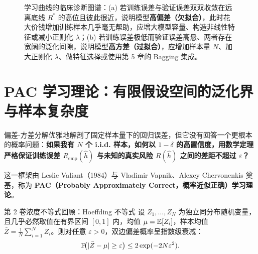 \begin{figure}[htbp]
\caption{学习曲线的临床诊断图谱：(a) 若训练误差与验证误差双双收敛在远离底线 $R^*$ 的高位且彼此很近，说明模型\textbf{高偏差（欠拟合）}，此时花大价钱增加训练样本几乎毫无帮助，应增大模型容量、构造非线性特征或减小正则化 $\lambda$；(b) 若训练误差极低而验证误差高悬、两者存在宽阔的泛化间隙，说明模型\textbf{高方差（过拟合）}，应增加样本量 $N$、加大正则化 $\lambda$、做特征选择或使用第 5 章的 Bagging 集成。}\label{fig:v4-learning-curves}
\end{figure}

\section{PAC 学习理论：有限假设空间的泛化界与样本复杂度}

偏差-方差分解优雅地解剖了固定样本量下的回归误差，但它没有回答一个更根本的概率问题：\textbf{如果我有 $N$ 个 i.i.d. 样本，如何以 $1-\delta$ 的高置信度，用数学定理严格保证训练误差 $R_{\mathrm{emp}}(\hat{h})$ 与未知的真实风险 $R(\hat{h})$ 之间的差距不超过 $\varepsilon$？}

这一框架由 Leslie Valiant（1984）与 Vladimir Vapnik、Alexey Chervonenkis 奠基，称为 \textbf{PAC（Probably Approximately Correct，概率近似正确）学习理论}。

\begin{recallBox}{第 2 卷浓度不等式回顾：Hoeffding 不等式}
设 $Z_1, \dots, Z_N$ 为独立同分布随机变量，且几乎必然取值在有界区间 $[0, 1]$ 内，均值 $\mu = \mathbb{E}[Z_i]$，样本均值 $\bar{Z} = \frac{1}{N}\sum_{i=1}^N Z_i$。则对任意 $\varepsilon > 0$，双边偏差概率呈指数级衰减：
\begin{equation}\label{eq:v4-hoeffding}
  \mathbb{P}\!\big(|\bar{Z} - \mu| \ge \varepsilon\big) \le 2\exp(-2N\varepsilon^2).
\end{equation}
\end{recallBox}

